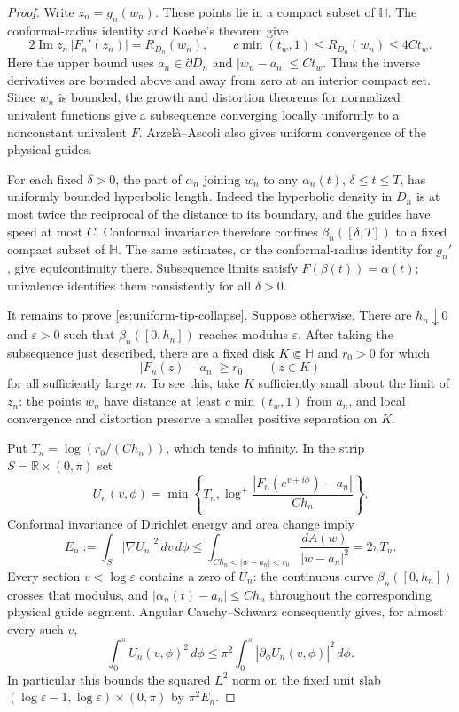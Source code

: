 \documentclass[11pt]{article}
\theoremstyle{definition}
\theoremstyle{remark}
\numberwithin{equation}{section}
\begin{document}
\begin{proof}
Write $z_n=g_n(w_n)$.  These points lie in a compact subset of
$\mathbb H$.  The conformal-radius identity and Koebe's theorem give
\[
 2\operatorname{Im}z_n\,|F_n'(z_n)|
   =R_{D_n}(w_n),\qquad
 c\min(t_w,1)\le R_{D_n}(w_n)\le4Ct_w.
\]
Here the upper bound uses $a_n\in\partial D_n$ and
$|w_n-a_n|\le Ct_w$.  Thus the inverse derivatives are bounded above
and away from zero at an interior compact set.  Since $w_n$ is bounded,
the growth and distortion theorems for normalized univalent functions
give a subsequence converging locally uniformly to a nonconstant
univalent $F$.  Arzel\`a--Ascoli also gives uniform convergence of the
physical guides.

For each fixed $\delta>0$, the part of $\alpha_n$ joining $w_n$ to any
$\alpha_n(t)$, $\delta\le t\le T$, has uniformly bounded hyperbolic
length.  Indeed the hyperbolic density in $D_n$ is at most twice the
reciprocal of the distance to its boundary, and the guides have speed
at most $C$.  Conformal invariance therefore confines
$\beta_n([\delta,T])$ to a fixed compact subset of $\mathbb H$.
The same estimates, or the conformal-radius identity for $g_n'$,
give equicontinuity there.  Subsequence limits satisfy
$F(\beta(t))=\alpha(t)$; univalence identifies them consistently for
all $\delta>0$.

It remains to prove \eqref{es:uniform-tip-collapse}.  Suppose otherwise.
There are $h_n\downarrow0$ and $\varepsilon>0$ such that
$\beta_n([0,h_n])$ reaches modulus $\varepsilon$.  After taking the
subsequence just described, there are a fixed disk $K\Subset\mathbb H$
and $r_0>0$ for which
\begin{equation}\label{es:waypoint-separation}
 |F_n(z)-a_n|\ge r_0\qquad(z\in K)
\end{equation}
for all sufficiently large $n$.  To see this, take $K$ sufficiently
small about the limit of $z_n$: the points $w_n$ have distance at least
$c\min(t_w,1)$ from $a_n$, and local convergence and distortion preserve
a smaller positive separation on $K$.

Put $T_n=\log(r_0/(Ch_n))$, which tends to infinity.  In the strip
$S=\mathbb R\times(0,\pi)$ set
\[
 U_n(v,\phi)=\min\left\{T_n,
       \log^+\frac{|F_n(e^{v+i\phi})-a_n|}{Ch_n}\right\}.
\]
Conformal invariance of Dirichlet energy and area change imply
\begin{equation}\label{es:collapse-energy}
 E_n:=\int_S|\nabla U_n|^2\,dv\,d\phi
 \le\int_{Ch_n<|w-a_n|<r_0}\frac{dA(w)}{|w-a_n|^2}
 =2\pi T_n.
\end{equation}
Every section $v<\log\varepsilon$ contains a zero of $U_n$:
the continuous curve $\beta_n([0,h_n])$ crosses that modulus, and
$|\alpha_n(t)-a_n|\le Ch_n$ throughout the corresponding physical
guide segment.  Angular Cauchy--Schwarz consequently gives, for almost
every such $v$,
\[
 \int_0^\pi U_n(v,\phi)^2\,d\phi
       \le\pi^2\int_0^\pi|\partial_\phi U_n(v,\phi)|^2\,d\phi.
\]
In particular this bounds the squared $L^2$ norm on the fixed unit
slab $(\log\varepsilon-1,\log\varepsilon)\times(0,\pi)$ by
$\pi^2E_n$.


\end{proof}
\end{document}
